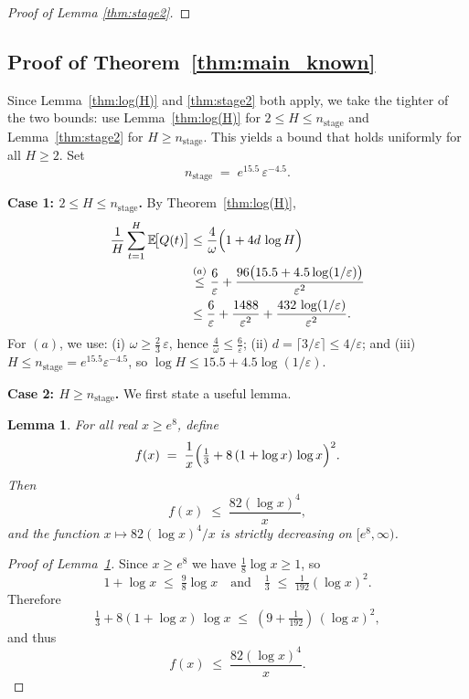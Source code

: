 \documentclass[12pt,draftcls, onecolumn]{IEEEtran}
\newcommand{\velb}{\varepsilon}
\newcommand{\vedisc}{\omega}
\newcommand{\EE}{\mathbb{E}}
\newtheorem{lemma}{Lemma}
\begin{document}
{\begin{proof}[Proof of Lemma \ref{thm:stage2}]
\end{proof}
\subsection{Proof of Theorem~\ref{thm:main_known}}\label{app:Proof-thm:main_known}
Since Lemma~\ref{thm:log(H)} and \ref{thm:stage2} both apply, we take the tighter of the two bounds: use Lemma~\ref{thm:log(H)} for \(2 \le H \le n_{\mathrm{stage}}\) and Lemma~\ref{thm:stage2} for \(H \ge n_{\mathrm{stage}}\). This yields a bound that holds uniformly for all \(H \ge 2\). Set
\[
  n_{\mathrm{stage}} \;=\; e^{15.5}\,\velb^{-4.5}.
\]

\noindent\textbf{Case 1: \(2 \le H \le n_{\mathrm{stage}}\).}
By Theorem~\ref{thm:log(H)},
\begin{align*}
    \frac{1}{H}\sum_{t=1}^H \EE\!\bigl[Q(t)\bigr]
    &\le  
    \frac{4}{\vedisc}\Bigl(1+4 d\,\log H\Bigr)
    \\
    &\stackrel{(a)}{\le}
    \frac{6}{\velb}
    + \frac{96\bigl(15.5 + 4.5\log(1/\velb)\bigr)}{\velb^{2}}
    \\
    &\le
    \frac{6}{\velb}
    + \frac{1488}{\velb^{2}}
    + \frac{432\,\log(1/\velb)}{\velb^{2}}.
\end{align*}
For \((a)\), we use: (i) \(\vedisc \ge \tfrac{2}{3}\,\velb\), hence \(\tfrac{4}{\vedisc} \le \tfrac{6}{\velb}\); (ii) \(d = \lceil 3/\velb\rceil \le 4/\velb\); and (iii) \(H \le n_{\mathrm{stage}} = e^{15.5}\velb^{-4.5}\), so \(\log H \le 15.5 + 4.5\log(1/\velb)\).


\noindent\textbf{Case 2: \(H \ge n_{\mathrm{stage}}\).}
We first state a useful lemma.

\begin{lemma}\label{lem:decreasing-for-H-large}
For all real \(x\ge e^{8}\), define
\[
f(x)\;=\;\frac{1}{x}\Bigl(\tfrac13+8\,(1+\log x)\,\log x\Bigr)^2.
\]
Then
\[
f(x)\;\le\;\frac{82(\log x)^4}{x},
\]
and the function \(x\mapsto 82(\log x)^4/x\) is strictly decreasing on \([e^{8},\infty)\).
\end{lemma}

\begin{proof}[Proof of Lemma~\ref{lem:decreasing-for-H-large}]
Since \(x\ge e^{8}\) we have \(\tfrac{1}{8}\log x\ge 1 \), so
\[
1+\log x\;\le\;\tfrac{9}{8}\log x
\quad\text{and}\quad
\tfrac13\;\le\;\tfrac{1}{192}(\log x)^2.
\]
Therefore
\[
\tfrac13 +8(1+\log x)\,\log x
\;\le\;(9+\tfrac{1}{192})\,(\log x)^2,
\]
and thus
\[
f(x)\;\le\;
\frac{82(\log x)^4}{x}.
\]


\end{proof}}
\end{document}
